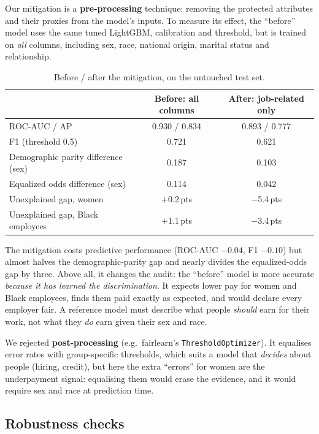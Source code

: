\documentclass[11pt,a4paper]{article}
\newcommand{\pts}{\,pts\xspace}
\begin{document}
Our mitigation is a \textbf{pre-processing} technique: removing the protected attributes and their proxies from the model's inputs. To measure its effect, the ``before'' model uses the same tuned LightGBM, calibration and threshold, but is trained on \emph{all} columns, including sex, race, national origin, marital status and relationship.

\begin{table}[H]
\centering\small
\caption{Before / after the mitigation, on the untouched test set.}
\label{tab:before_after}
\begin{tabular}{lcc}
\toprule
\rowcolor{headblue}
 & Before: all columns & After: job-related only \\
\midrule
ROC-AUC / AP & 0.930 / 0.834 & 0.893 / 0.777 \\
F1 (threshold 0.5) & 0.721 & 0.621 \\
Demographic parity difference (sex) & 0.187 & 0.103 \\
Equalized odds difference (sex) & 0.114 & 0.042 \\
Unexplained gap, women & $+$0.2\pts & $-$5.4\pts \\
Unexplained gap, Black employees & $+$1.1\pts & $-$3.4\pts \\
\bottomrule
\end{tabular}
\end{table}

\noindent The mitigation costs predictive performance (ROC-AUC $-0.04$, F1 $-0.10$) but almost halves the demographic-parity gap and nearly divides the equalized-odds gap by three. Above all, it changes the audit: the ``before'' model is more accurate \emph{because it has learned the discrimination}. It expects lower pay for women and Black employees, finds them paid exactly as expected, and would declare every employer fair. A reference model must describe what people \emph{should} earn for their work, not what they \emph{do} earn given their sex and race.

We rejected \textbf{post-processing} (e.g.\ fairlearn's \texttt{ThresholdOptimizer}). It equalises error rates with group-specific thresholds, which suits a model that \emph{decides} about people (hiring, credit), but here the extra ``errors'' for women are the underpayment signal: equalising them would erase the evidence, and it would require sex and race at prediction time.

\subsection{Robustness checks}\label{sec:sensitivity}
\end{document}
